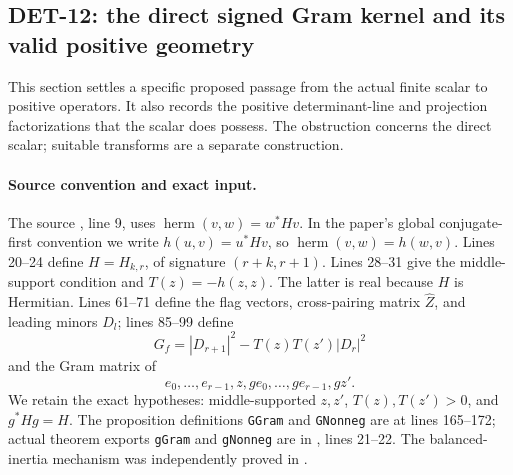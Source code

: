 \subsection{DET-12: the direct signed Gram kernel and its valid positive geometry}
This section settles a specific proposed passage from the actual finite scalar to
positive operators. It also records the positive determinant-line and projection
factorizations that the scalar does possess. The obstruction concerns the direct
scalar; suitable transforms are a separate construction.

\paragraph{Source convention and exact input.}
The source , line 9, uses
\(\operatorname{herm}(v,w)=w^*Hv\). In the paper's global conjugate-first convention
we write \(h(u,v)=u^*Hv\), so \(\operatorname{herm}(v,w)=h(w,v)\).
Lines 20--24 define \(H=H_{k,r}\), of signature \((r+k,r+1)\).
Lines 28--31 give the middle-support condition and \(T(z)=-h(z,z)\).
The latter is real because \(H\) is Hermitian. Lines 61--71 define the flag
vectors, cross-pairing matrix \(\widehat Z\), and leading minors \(D_l\);
lines 85--99 define
\[
 G_f=|D_{r+1}|^2-T(z)T(z')|D_r|^2
\]
and the Gram matrix of
\[
 e_0,\ldots,e_{r-1},z,ge_0,\ldots,ge_{r-1},gz'.
\]
We retain the exact hypotheses: middle-supported \(z,z'\), \(T(z),T(z')>0\),
and \(g^*Hg=H\). The proposition definitions \texttt{GGram} and
\texttt{GNonneg} are at lines 165--172; actual theorem exports
\texttt{gGram} and \texttt{gNonneg} are in
, lines 21--22.
The balanced-inertia mechanism was independently proved in .

